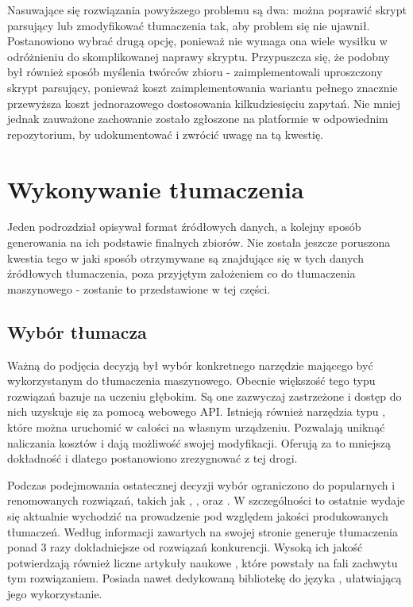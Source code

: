 Nasuwające się rozwiązania powyższego problemu są dwa: można poprawić skrypt parsujący lub zmodyfikować tłumaczenia tak, aby problem się nie ujawnił. Postanowiono wybrać drugą opcję, ponieważ nie wymaga ona wiele wysiłku w odróżnieniu do skomplikowanej naprawy skryptu. Przypuszcza się, że podobny był również sposób myślenia twórców zbioru  - zaimplementowali uproszczony skrypt parsujący, ponieważ koszt zaimplementowania wariantu pełnego znacznie przewyższa koszt jednorazowego dostosowania kilkudziesięciu zapytań. Nie mniej jednak zauważone zachowanie zostało zgłoszone na platformie  w odpowiednim repozytorium, by udokumentować i zwrócić uwagę na tą kwestię.

\section{Wykonywanie tłumaczenia}
Jeden podrozdział opisywał format źródłowych danych, a kolejny sposób generowania na ich podstawie finalnych zbiorów. Nie została jeszcze poruszona kwestia tego w jaki sposób otrzymywane są znajdujące się w tych danych źródłowych tłumaczenia, poza przyjętym założeniem co do tłumaczenia maszynowego - zostanie to przedstawione w tej części.

\subsection{Wybór tłumacza}
Ważną do podjęcia decyzją był wybór konkretnego narzędzie mającego być wykorzystanym do tłumaczenia maszynowego. Obecnie większość tego typu rozwiązań bazuje na uczeniu głębokim. Są one zazwyczaj zastrzeżone i dostęp do nich uzyskuje się za pomocą webowego API. Istnieją również narzędzia typu , które można uruchomić w całości na własnym urządzeniu. Pozwalają uniknąć naliczania kosztów i dają możliwość swojej modyfikacji. Oferują za to mniejszą dokładność i dlatego postanowiono zrezygnować z tej drogi.

Podczas podejmowania ostatecznej decyzji wybór ograniczono do popularnych i renomowanych rozwiązań, takich jak  \cite{google-translation-api},  \cite{microsoft-translator},  \cite{amazon-translator} oraz  \cite{deepl}. W szczególności to ostatnie wydaje się aktualnie wychodzić na prowadzenie pod względem jakości produkowanych tłumaczeń. Według informacji zawartych na swojej stronie  generuje tłumaczenia ponad 3 razy dokładniejsze od rozwiązań konkurencji. Wysoką ich jakość potwierdzają również liczne artykuły naukowe \cite{Yulianto2021}\cite{Ternero2021}\cite{Bahasa2023}, które powstały na fali zachwytu tym rozwiązaniem. Posiada nawet dedykowaną bibliotekę do języka , ułatwiającą jego wykorzystanie. 

